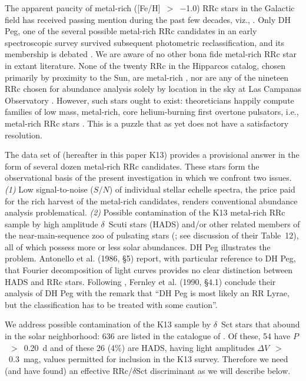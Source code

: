 \documentclass[preprint]{aastex6}
\def\ie{\mbox{i.e.}}
\begin{document}
The apparent paucity of metal-rich ([Fe/H]~$>$~$-$1.0) RRc stars in the 
Galactic field has received passing mention during the past few decades, 
viz., \cite{smith95}. 
Only DH Peg, one of the several possible metal-rich RRc candidates in an 
early spectroscopic survey \citep{preston59} survived subsequent photometric 
reclassification, and its membership is debated \citep{fernley90}. 
We are aware of no other bona fide metal-rich RRc star in extant literature. 
None of the twenty RRc in the Hipparcos catalog, chosen primarily by 
proximity to the Sun, are metal-rich \citep{feast08}, nor are any of the 
nineteen RRc chosen for abundance analysis solely by location in the sky at 
Las Campanas Observatory \citep{sneden17}. 
However, such stars ought to exist: theoreticians happily compute 
families of low mass, metal-rich, core helium-burning first 
overtone pulsators, \ie, metal-rich RRc stars \citep{marconi15}.
This is a puzzle that as yet does not have a satisfactory resolution.

The data set of \cite{kollmeier13} (hereafter in this paper K13) provides a 
provisional answer in the form of several dozen metal-rich RRc candidates.  
These stars form the observational basis of the present investigation in which 
we confront two issues. 
\textit{(1)} Low signal-to-noise ($S/N$) of individual stellar echelle spectra, 
the price paid for the rich harvest of the metal-rich candidates, renders 
conventional abundance analysis problematical. 
\textit{(2)} Possible contamination of the K13 metal-rich RRc 
sample by high amplitude $\delta$~Scuti stars (HADS) and/or other related 
members of the near-main-sequence zoo of pulsating stars 
(\citealt{rodriguez00}; see discussion of their Table~12), all of 
which possess more or less solar abundances.
DH Peg illustrates the problem.  
Antonello et al. (1986, \S5)\nocite{antonello86} report, with particular 
reference to DH Peg, that Fourier decomposition of light curves provides 
no clear distinction between HADS and RRc stars.  
Following \citeauthor{antonello86}, Fernley et al. (1990, 
\S4.1)\nocite{fernley90} conclude their analysis of DH Peg with the remark 
that ``DH Peg is most likely an RR Lyrae, but the classification has to be 
treated with some caution''.

We address possible contamination of the K13 sample by $\delta$~Sct stars 
that abound in the solar neighborhood: 636 are listed in the catalogue 
of \cite{rodriguez00}.  
Of these, 54 have $P$~$>$~0.20~d and of these 26 (4\%) are HADS, having light 
amplitudes $\Delta V$~$>$~0.3~mag, values permitted for inclusion in the 
K13 survey. 
Therefore we need (and have found) an effective RRc/$\delta$Sct 
discriminant as we will describe below.
\end{document}
